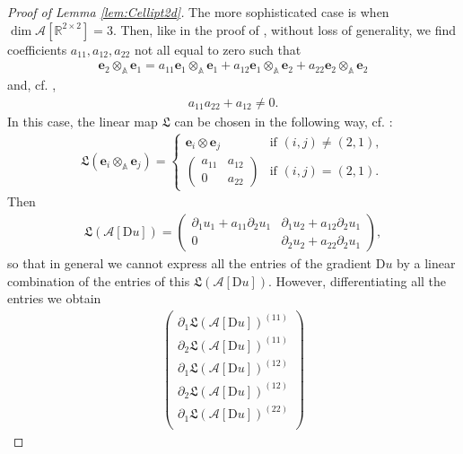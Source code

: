 \documentclass[a4paper,10pt,reqno,oneside]{amsart}
\numberwithin{equation}{section}
\newcommand{\R}{\mathbb R}
\newcommand{\A}{\mathscr{A}}
\newcommand{\Aop}{\mathbb{A}}
\newcommand{\D}{\mathrm{D}}
\newcommand{\e}{\mathbf{e}}
\begin{document}
\begin{proof}[Proof of Lemma \ref{lem:Cellipt2d}]
The more sophisticated case is when $\dim{\A[\R^{2\times2}]}=3$. Then, like in the proof of \cite[Prop. 4.1]{GLN1}, without loss of generality, we find coefficients $a_{11}, a_{12}, a_{22}$ not all equal to zero such that
\begin{align*}
 \e_2\otimes_{\Aop}\e_1=a_{11}\e_1\otimes_\Aop \e_1 + a_{12}\e_1\otimes_{\Aop}\e_2+a_{22}\e_2\otimes_{\Aop}\e_2
\end{align*}
and, cf. \cite[Eq. (4.8)]{GLN1},
\begin{align}\label{eq:detG}
 a_{11}a_{22}+a_{12}\neq0.
\end{align}
In this case, the linear map $\mathfrak{L}$ can be chosen in the following way, cf. \cite[Eq. (4.12) f]{GLN1}:
\begin{align*}
 \mathfrak{L}(\e_i\otimes_\Aop\e_j)=\begin{cases}
                                     \e_i\otimes \e_j & \text{if } (i,j)\neq(2,1),\\[1ex]
                                     \begin{pmatrix}
                                      a_{11} & a_{12} \\ 0 & a_{22}
                                     \end{pmatrix} & \text{if } (i,j)=(2,1).
                                    \end{cases}
\end{align*}
Then
\begin{align*}
 \mathfrak{L}(\A[\D u])=\begin{pmatrix}
                       \partial_1 u_1 + a_{11}\partial_2 u_1 & \partial_1 u_2 + a_{12}\partial_2 u_1 \\ 0 & \partial_2u_2 + a_{22}\partial_2 u_1  
                        \end{pmatrix},
\end{align*}
so that in general we cannot express all the entries of the gradient $\D u$ by a linear combination of the entries of this $\mathfrak{L}(\A[\D u])$. However, differentiating all the entries we obtain
\begin{align*}
 \begin{pmatrix}
  \partial_1 \mathfrak{L}(\A[\D u])^{(11)}\\
  \partial_2 \mathfrak{L}(\A[\D u])^{(11)}\\
  \partial_1 \mathfrak{L}(\A[\D u])^{(12)}\\
  \partial_2 \mathfrak{L}(\A[\D u])^{(12)}\\
  \partial_1 \mathfrak{L}(\A[\D u])^{(22)}\\

\end{pmatrix}
\end{align*}
\end{proof}
\end{document}
